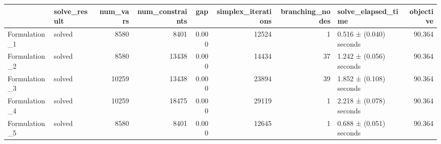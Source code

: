 \begin{tabular}{llrrrrrlr}
\toprule
 & solve_result & num_vars & num_constraints & gap & simplex_iterations & branching_nodes & solve_elapsed_time & objective \\
\midrule
Formulation_1 & solved & 8580 & 8401 & 0.000 & 12524 & 1 & 0.516 ± (0.040) seconds & 90.364 \\
Formulation_2 & solved & 8580 & 13438 & 0.000 & 14434 & 37 & 1.242 ± (0.056) seconds & 90.364 \\
Formulation_3 & solved & 10259 & 13438 & 0.000 & 23894 & 39 & 1.852 ± (0.108) seconds & 90.364 \\
Formulation_4 & solved & 10259 & 18475 & 0.000 & 29119 & 1 & 2.218 ± (0.078) seconds & 90.364 \\
Formulation_5 & solved & 8580 & 8401 & 0.000 & 12645 & 1 & 0.688 ± (0.051) seconds & 90.364 \\
\bottomrule
\end{tabular}
